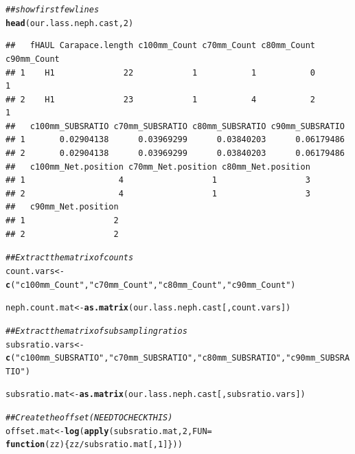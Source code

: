 \documentclass[12pt]{article}\usepackage[]{graphicx}\usepackage[]{color}
\makeatletter
\newcommand{\hlnum}[1]{\textcolor[rgb]{0.686,0.059,0.569}{#1}}%
\newcommand{\hlstr}[1]{\textcolor[rgb]{0.192,0.494,0.8}{#1}}%
\newcommand{\hlcom}[1]{\textcolor[rgb]{0.678,0.584,0.686}{\textit{#1}}}%
\newcommand{\hlopt}[1]{\textcolor[rgb]{0,0,0}{#1}}%
\newcommand{\hlstd}[1]{\textcolor[rgb]{0.345,0.345,0.345}{#1}}%
\newcommand{\hlkwa}[1]{\textcolor[rgb]{0.161,0.373,0.58}{\textbf{#1}}}%
\newcommand{\hlkwb}[1]{\textcolor[rgb]{0.69,0.353,0.396}{#1}}%
\newcommand{\hlkwc}[1]{\textcolor[rgb]{0.333,0.667,0.333}{#1}}%
\newcommand{\hlkwd}[1]{\textcolor[rgb]{0.737,0.353,0.396}{\textbf{#1}}}%
\newenvironment{kframe}{%
 \def\at@end@of@kframe{}%
 \ifinner\ifhmode%
  \def\at@end@of@kframe{\end{minipage}}%
  \begin{minipage}{\columnwidth}%
 \fi\fi%
 \def\FrameCommand##1{\hskip\@totalleftmargin \hskip-\fboxsep
 \colorbox{shadecolor}{##1}\hskip-\fboxsep
     \hskip-\linewidth \hskip-\@totalleftmargin \hskip\columnwidth}%
 \MakeFramed {\advance\hsize-\width
   \@totalleftmargin\z@ \linewidth\hsize
   \@setminipage}}%
 {\par\unskip\endMakeFramed%
 \at@end@of@kframe}
\newenvironment{knitrout}{}{} %
\makeatother
\begin{document}
\begin{knitrout}
\begin{kframe}
\begin{alltt}
\hlcom{## show first few lines}
\hlkwd{head}\hlstd{(our.lass.neph.cast,} \hlnum{2}\hlstd{)}
\end{alltt}
\begin{verbatim}
##   fHAUL Carapace.length c100mm_Count c70mm_Count c80mm_Count c90mm_Count
## 1    H1              22            1           1           0           1
## 2    H1              23            1           4           2           1
##   c100mm_SUBSRATIO c70mm_SUBSRATIO c80mm_SUBSRATIO c90mm_SUBSRATIO
## 1       0.02904138      0.03969299      0.03840203      0.06179486
## 2       0.02904138      0.03969299      0.03840203      0.06179486
##   c100mm_Net.position c70mm_Net.position c80mm_Net.position
## 1                   4                  1                  3
## 2                   4                  1                  3
##   c90mm_Net.position
## 1                  2
## 2                  2
\end{verbatim}
\begin{alltt}
\hlcom{## Extract the matrix of counts}
\hlstd{count.vars} \hlkwb{<-} \hlkwd{c}\hlstd{(}\hlstr{"c100mm_Count"}\hlstd{,} \hlstr{"c70mm_Count"}\hlstd{,} \hlstr{"c80mm_Count"}\hlstd{,} \hlstr{"c90mm_Count"}\hlstd{)}

\hlstd{neph.count.mat} \hlkwb{<-} \hlkwd{as.matrix}\hlstd{(our.lass.neph.cast[, count.vars])}

\hlcom{## Extract the matrix of subsampling ratios}
\hlstd{subsratio.vars} \hlkwb{<-} \hlkwd{c}\hlstd{(}\hlstr{"c100mm_SUBSRATIO"}\hlstd{,} \hlstr{"c70mm_SUBSRATIO"}\hlstd{,} \hlstr{"c80mm_SUBSRATIO"}\hlstd{,} \hlstr{"c90mm_SUBSRATIO"}\hlstd{)}

\hlstd{subsratio.mat} \hlkwb{<-} \hlkwd{as.matrix}\hlstd{(our.lass.neph.cast[, subsratio.vars])}

\hlcom{## Create the offset (NEED TO CHECK THIS)}
\hlstd{offset.mat} \hlkwb{<-} \hlkwd{log}\hlstd{(}\hlkwd{apply}\hlstd{(subsratio.mat,} \hlnum{2}\hlstd{,} \hlkwc{FUN} \hlstd{=}
                        \hlkwa{function}\hlstd{(}\hlkwc{zz}\hlstd{)\{zz}\hlopt{/}\hlstd{subsratio.mat[,}\hlnum{1}\hlstd{]\}))}
\end{alltt}
\end{kframe}
\end{knitrout}
\end{document}
